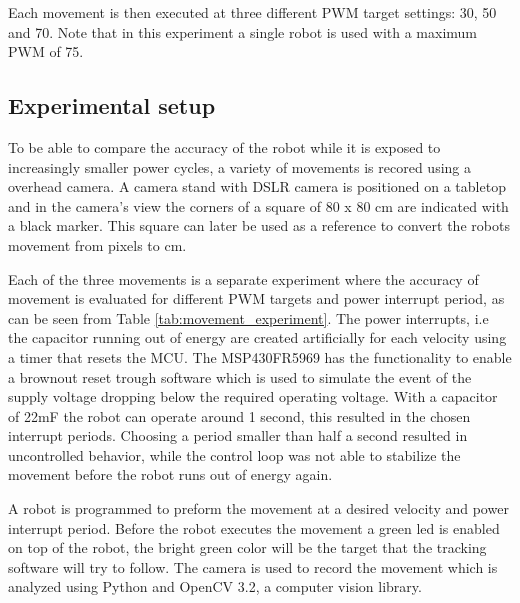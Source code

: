 Each movement is then executed at three different PWM target settings: 30, 50 and 70.
Note that in this experiment a single robot is used with a maximum PWM of 75.

\subsection{Experimental setup}

To be able to compare the accuracy of the robot while it is exposed to increasingly smaller power cycles, a variety of movements is recored using a overhead camera.
A camera stand with DSLR camera is positioned on a tabletop and in the camera's view the corners of a square of 80 x 80 cm are indicated with a black marker.
This square can later be used as a reference to convert the robots movement from pixels to cm.

Each of the three movements is a separate experiment where the accuracy of movement is evaluated for different PWM targets and power interrupt period, as can be seen from Table \ref{tab:movement_experiment}.
The power interrupts, i.e the capacitor running out of energy are created artificially for each velocity using a timer that resets the MCU.
The MSP430FR5969 has the functionality to enable a brownout reset trough software which is used to simulate the event of the supply voltage dropping below the required operating voltage.
With a capacitor of 22mF the robot can operate around 1 second, this resulted in the chosen interrupt periods.
Choosing a period smaller than half a second resulted in uncontrolled behavior, while the control loop was not able to stabilize the movement before the robot runs out of energy again.

A robot is programmed to preform the movement at a desired velocity and power interrupt period.
Before the robot executes the movement a green led is enabled on top of the robot, the bright green color will be the target that the tracking software will try to follow.
The camera is used to record the movement which is analyzed using Python and OpenCV 3.2, a computer vision library.


